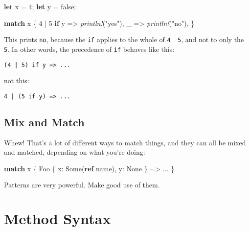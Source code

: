 \documentclass[a4paper,]{book}
\renewcommand*{\hypertarget}[3][\ar]{%
  \def\ar{#2}%
  \label{#1}%
  #3}
\newenvironment{Shaded}{\begin{snugshade}}{\end{snugshade}}
\newcommand{\KeywordTok}[1]{\textcolor[rgb]{0.13,0.29,0.53}{\textbf{{#1}}}}
\newcommand{\DecValTok}[1]{\textcolor[rgb]{0.00,0.00,0.81}{{#1}}}
\newcommand{\ConstantTok}[1]{\textcolor[rgb]{0.00,0.00,0.00}{{#1}}}
\newcommand{\StringTok}[1]{\textcolor[rgb]{0.31,0.60,0.02}{{#1}}}
\newcommand{\PreprocessorTok}[1]{\textcolor[rgb]{0.56,0.35,0.01}{\textit{{#1}}}}
\newcommand{\NormalTok}[1]{{#1}}
\begin{document}
\begin{Shaded}
\begin{Highlighting}[]
\KeywordTok{let} \NormalTok{x = }\DecValTok{4}\NormalTok{;}
\KeywordTok{let} \NormalTok{y = }\ConstantTok{false}\NormalTok{;}

\KeywordTok{match} \NormalTok{x \{}
    \DecValTok{4} \NormalTok{| }\DecValTok{5} \KeywordTok{if} \NormalTok{y => }\PreprocessorTok{println!}\NormalTok{(}\StringTok{"yes"}\NormalTok{),}
    \NormalTok{_ => }\PreprocessorTok{println!}\NormalTok{(}\StringTok{"no"}\NormalTok{),}
\NormalTok{\}}
\end{Highlighting}
\end{Shaded}

This prints \texttt{no}, because the \texttt{if} applies to the whole of
\texttt{4\ \textbar{}\ 5}, and not to only the \texttt{5}. In other
words, the precedence of \texttt{if} behaves like this:

\begin{verbatim}
(4 | 5) if y => ...
\end{verbatim}

not this:

\begin{verbatim}
4 | (5 if y) => ...
\end{verbatim}

\subsection{Mix and Match}\label{mix-and-match}

Whew! That's a lot of different ways to match things, and they can all
be mixed and matched, depending on what you're doing:

\begin{Shaded}
\begin{Highlighting}[]
\KeywordTok{match} \NormalTok{x \{}
    \NormalTok{Foo \{ x: }\ConstantTok{Some}\NormalTok{(}\KeywordTok{ref} \NormalTok{name), y: }\ConstantTok{None} \NormalTok{\} => ...}
\NormalTok{\}}
\end{Highlighting}
\end{Shaded}

Patterns are very powerful. Make good use of them.

\hypertarget{sec--method-syntax}{\section{Method
Syntax}\label{sec--method-syntax}}
\end{document}
